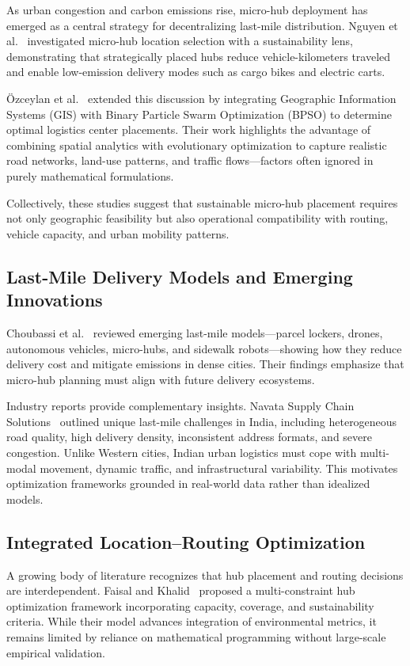 \documentclass[conference]{IEEEtran}
\begin{document}
As urban congestion and carbon emissions rise, micro-hub deployment has emerged as a central strategy for decentralizing last-mile distribution. Nguyen et al.~\cite{b1} investigated micro-hub location selection with a sustainability lens, demonstrating that strategically placed hubs reduce vehicle-kilometers traveled and enable low-emission delivery modes such as cargo bikes and electric carts.

Özceylan et al.~\cite{b2} extended this discussion by integrating Geographic Information Systems (GIS) with Binary Particle Swarm Optimization (BPSO) to determine optimal logistics center placements. Their work highlights the advantage of combining spatial analytics with evolutionary optimization to capture realistic road networks, land-use patterns, and traffic flows—factors often ignored in purely mathematical formulations.

Collectively, these studies suggest that sustainable micro-hub placement requires not only geographic feasibility but also operational compatibility with routing, vehicle capacity, and urban mobility patterns.

\subsection{Last-Mile Delivery Models and Emerging Innovations}

Choubassi et al.~\cite{b3} reviewed emerging last-mile models—parcel lockers, drones, autonomous vehicles, micro-hubs, and sidewalk robots—showing how they reduce delivery cost and mitigate emissions in dense cities. Their findings emphasize that micro-hub planning must align with future delivery ecosystems.

Industry reports provide complementary insights. Navata Supply Chain Solutions~\cite{b5} outlined unique last-mile challenges in India, including heterogeneous road quality, high delivery density, inconsistent address formats, and severe congestion. Unlike Western cities, Indian urban logistics must cope with multi-modal movement, dynamic traffic, and infrastructural variability. This motivates optimization frameworks grounded in real-world data rather than idealized models.

\subsection{Integrated Location–Routing Optimization}

A growing body of literature recognizes that hub placement and routing decisions are interdependent. Faisal and Khalid~\cite{b6} proposed a multi-constraint hub optimization framework incorporating capacity, coverage, and sustainability criteria. While their model advances integration of environmental metrics, it remains limited by reliance on mathematical programming without large-scale empirical validation.
\end{document}

